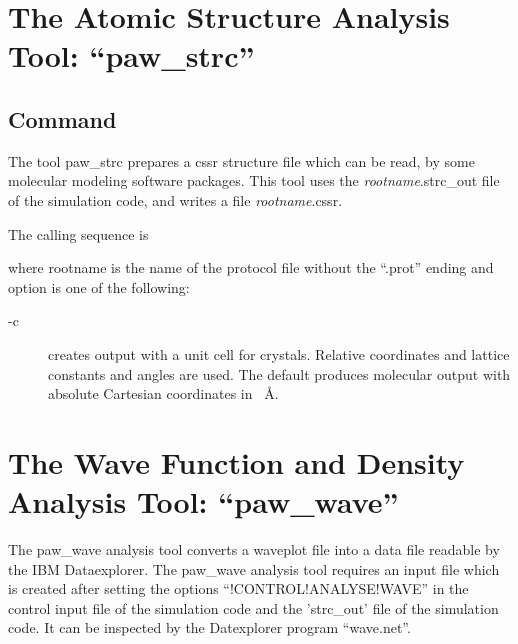\documentclass[final,12pt]{article}
\begin{document}
{%
\section{The Atomic Structure Analysis Tool: ``paw\_strc''}
\subsection{Command}
The tool paw\_strc prepares a cssr structure file which can be read,
by some molecular modeling software packages. This tool uses the {\it
  rootname}.strc\_out file of the simulation code, and writes a file
{\it rootname}.cssr.

The calling sequence is

\bigskip{}\bigskip

\noindent
where rootname is the name of the protocol file without the ``.prot''
ending and option is one of the following:
\begin{description}
\item[-c] creates output with a unit cell for crystals. Relative
  coordinates and lattice constants and angles are used. The default
  produces molecular output with absolute Cartesian coordinates in
  ~\AA.
\end{description}

\newpage
\section{The Wave Function and Density Analysis Tool: ``paw\_wave''}

The paw\_wave analysis tool converts a waveplot file into a data
file readable by the IBM Dataexplorer. The paw\_wave analysis tool
requires an input file which is created after setting the options
``!CONTROL!ANALYSE!WAVE'' in the control input file of the simulation
code and the 'strc\_out' file of the simulation code. It can be
inspected by the Datexplorer program ``wave.net''.

}
\end{document}
